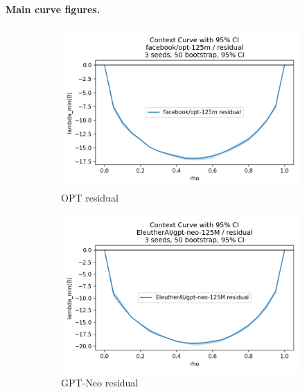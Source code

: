 \documentclass[11pt]{article}
\newcommand{\1}{\mathbf{1}}
\begin{document}
\paragraph{Main curve figures.}
\begin{figure}[t]
\centering
\begin{subfigure}[t]{0.32\textwidth}
\includegraphics[width=\linewidth]{figs/curve_facebook_opt-125m_residual.png}
\caption{OPT residual}
\end{subfigure}\hfill
\begin{subfigure}[t]{0.32\textwidth}
\includegraphics[width=\linewidth]{figs/curve_EleutherAI_gpt-neo-125M_residual.png}
\caption{GPT-Neo residual}
\end{subfigure}\hfill
\begin{subfigure}[t]{0.32\textwidth}

\end{subfigure}
\end{figure}
\end{document}
